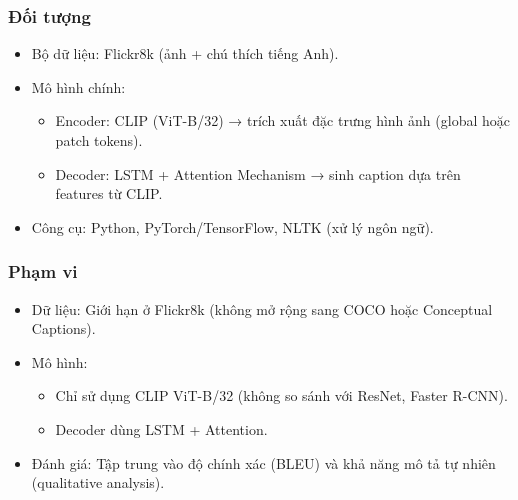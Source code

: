 \documentclass[../main.tex]{subfiles}
\begin{document}
\subsubsection*{Đối tượng}
\begin{itemize}
    \item Bộ dữ liệu: Flickr8k (ảnh + chú thích tiếng Anh).
    \item Mô hình chính:
    \begin{itemize}
        \item Encoder: CLIP (ViT-B/32) → trích xuất đặc trưng hình ảnh (global hoặc patch tokens).
        \item Decoder: LSTM + Attention Mechanism → sinh caption dựa trên features từ CLIP.
    \end{itemize}
    \item Công cụ: Python, PyTorch/TensorFlow, NLTK (xử lý ngôn ngữ).
\end{itemize}

\subsubsection*{Phạm vi}
\begin{itemize}
    \item Dữ liệu: Giới hạn ở Flickr8k (không mở rộng sang COCO hoặc Conceptual Captions).
    \item Mô hình:
    \begin{itemize}
        \item Chỉ sử dụng CLIP ViT-B/32 (không so sánh với ResNet, Faster R-CNN).
        \item Decoder dùng LSTM + Attention.
    \end{itemize}
    \item Đánh giá: Tập trung vào độ chính xác (BLEU) và khả năng mô tả tự nhiên (qualitative analysis).
\end{itemize}
\end{document}
